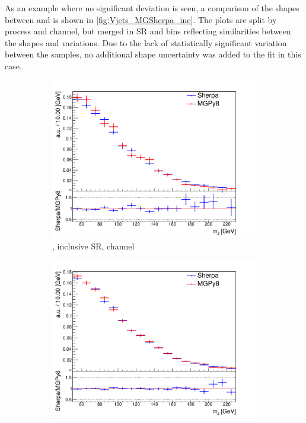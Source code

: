 As an example where no significant deviation is seen, a comparison of the \mJ shapes between \SHERPA and \MADGRAPH is shown in \cref{fig:Vjets_MGSherpa_inc}.
The plots are split by process and channel, but merged in SR and \ptv bins reflecting similarities between the \mJ shapes and variations.
Due to the lack of statistically significant variation between the samples, no additional shape uncertainty was added to the fit in this case. 

\begin{figure}[!htbp]
  \centering
  \begin{subfigure}{.5\textwidth}
    \includegraphics[width=\textwidth]{chapters/6.vhbb_boosted/figs/0L_Whf_2tag1pfat0pjet_ptvinc_SR_noaddbjetsr_mJIncl.pdf}
    \caption{\Whf, \pTV inclusive SR, \zlep channel}
    \label{fig:Vjets_MGSherpa_inc_sub1}
  \end{subfigure}%
  \hfill
  \begin{subfigure}{.5\textwidth}
    \includegraphics[width=\textwidth]{chapters/6.vhbb_boosted/figs/1L_Whf_2tag1pfat0pjet_ptvinc_SR_noaddbjetsr_mJIncl.pdf}

\end{subfigure}
\end{figure}
